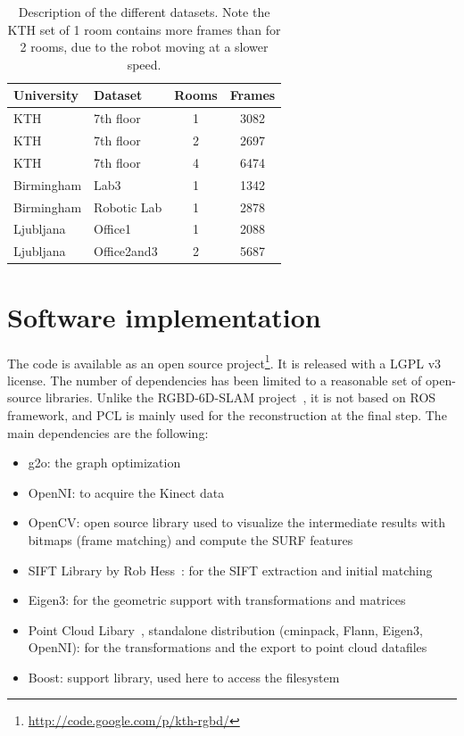 \begin{table}[H]
 \begin{center}
  \begin{tabular}{llcc}
  \hline
  University & Dataset & Rooms & Frames \\
  \hline
  KTH & 7th floor & 1 & 3082 \\
  KTH & 7th floor & 2 & 2697 \\
  KTH & 7th floor & 4 & 6474 \\
  Birmingham & Lab3 & 1 & 1342 \\
  Birmingham & Robotic Lab & 1 & 2878 \\
  Ljubljana & Office1 & 1 & 2088 \\
  Ljubljana & Office2and3 & 2 & 5687 \\
  \hline
  \end{tabular}
 \end{center}
 \caption{Description of the different datasets. Note the KTH set of 1 room contains more frames than for 2 rooms, due to the robot moving at a slower speed.}
 \label{tab:datasets}
\end{table}

\section{Software implementation}

The code is available as an open source project\footnote{\url{http://code.google.com/p/kth-rgbd/}}. It is released with a LGPL v3 license. The number of dependencies has been limited to a reasonable set of open-source libraries. Unlike the RGBD-6D-SLAM project~\cite{engelhard11euron-workshop}, it is not based on \gls{ROS} framework, and \gls{PCL} is mainly used for the reconstruction at the final step. The main dependencies are the following:
\begin{itemize}
\item g2o: the graph optimization
\item OpenNI: to acquire the Kinect data
\item OpenCV: open source library used to visualize the intermediate results with bitmaps (frame matching) and compute the \gls {SURF} features
\item SIFT Library by Rob Hess~\cite{hess_sift}: for the \gls{SIFT} extraction and initial matching
\item Eigen3: for the geometric support with transformations and matrices
\item Point Cloud Libary~\cite{Rusu_ICRA2011_PCL}, standalone distribution (cminpack, Flann, Eigen3, OpenNI): for the transformations and the export to point cloud datafiles
\item Boost: support library, used here to access the filesystem
\end{itemize}


